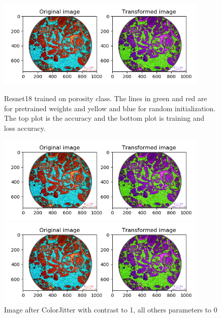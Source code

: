 \begin{figure}
    \centering
    \begin{minipage}{0.4\textwidth}
        \centering
        \includegraphics[width=0.9\textwidth]{figures/03-hue05.PNG} %
        \caption{Resnet18 trained on porosity class. The lines in green and red are for pretrained weights and yellow  and blue for random initialization. The top plot is the accuracy and the bottom plot is training  and loss accuracy. }\label{fig:classes}
    \end{minipage}
    \begin{minipage}{0.4\textwidth}
        \centering
        \includegraphics[width=0.9\textwidth]{figures/03-hue05.PNG} %
        \caption{Image after ColorJitter with contrast to 1, all others parameters to 0}\label{fig:litandstruc}
    \end{minipage}
    \begin{minipage}{0.4\textwidth}
        \centering
        \includegraphics[width=0.9\textwidth]{figures/03-hue05.PNG} %

\end{minipage}
\end{figure}
